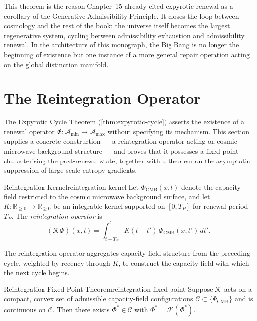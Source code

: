 \documentclass[12pt,twoside,openright]{book}
\begin{document}
This theorem is the reason Chapter~15 already cited
expyrotic renewal as a corollary of the Generative
Admissibility Principle. It closes the loop between
cosmology and the rest of the book: the universe itself
becomes the largest regenerative system, cycling between
admissibility exhaustion and admissibility renewal. In the
architecture of this monograph, the Big Bang is no longer
the beginning of existence but one instance of a more
general repair operation acting on the global distinction
manifold.

\section{The Reintegration Operator}
\label{sec:ch18-reintegration}

The Expyrotic Cycle Theorem (\cref{thm:expyrotic-cycle})
asserts the existence of a renewal operator
$\mathfrak{E}:\mathcal{A}_{\min}\to\mathcal{A}_{\max}$
without specifying its mechanism. This section supplies a
concrete construction --- a reintegration operator acting
on cosmic microwave background structure --- and proves that
it possesses a fixed point characterising the
post-renewal state, together with a theorem on the
asymptotic suppression of large-scale entropy gradients.

\begin{definition}{Reintegration Kernel}{reintegration-kernel}
  Let $\Phi_\mathrm{CMB}(x,t)$ denote the capacity field
  restricted to the cosmic microwave background surface, and
  let $K:\mathbb{R}_{\ge0}\to\mathbb{R}_{\ge0}$ be an
  integrable kernel supported on $[0,T_P]$ for renewal
  period $T_P$. The \emph{reintegration operator} is
  \[
    (\mathcal{K}\Phi)(x,t)
    = \int_{t-T_P}^{t} K(t-t')\, \Phi_\mathrm{CMB}(x,t')\, dt'.
  \]
\end{definition}

The reintegration operator aggregates capacity-field
structure from the preceding cycle, weighted by recency
through $K$, to construct the capacity field with which the
next cycle begins.

\begin{theorem}{Reintegration Fixed-Point Theorem}{reintegration-fixed-point}
  Suppose $\mathcal{K}$ acts on a compact, convex set of
  admissible capacity-field configurations
  $\mathcal{C} \subset \{\Phi_\mathrm{CMB}\}$ and is
  continuous on $\mathcal{C}$. Then there exists
  $\Phi^*\in\mathcal{C}$ with $\Phi^* = \mathcal{K}(\Phi^*)$.
\end{theorem}
\end{document}
